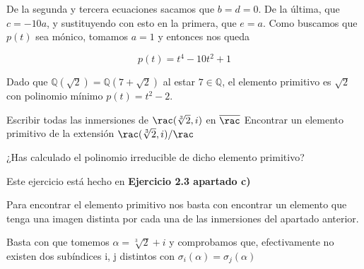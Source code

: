 \begin{problem}[1]
De la segunda y tercera ecuaciones sacamos que $b = d = 0$. De la última, que $c = -10a$, y sustituyendo con esto en la primera, que $e = a$. Como buscamos que $p(t)$ sea mónico, tomamos $a = 1$ y entonces nos queda

\[ p(t) = t^4 - 10t^2 + 1 \]

\spart

Dado que $ℚ(\sqrt{2}) = ℚ(7 + \sqrt{2})$ al estar $7 ∈ ℚ$, el elemento primitivo es $\sqrt{2}$ con polinomio mínimo $p(t) = t^2 - 2$.
\end{problem}

\begin{problem}[2]
\ppart Escribir todas las inmersiones de $\rac(\sqrt[3]{2}, i)$ en $\overline{\rac}$
\ppart Encontrar un elemento primitivo de la extensión $\rac(\sqrt[3]{2}, i)/\rac$

¿Has calculado el polinomio irreducible de dicho elemento primitivo?
\solution

\spart
Este ejercicio está hecho en \textbf{Ejercicio 2.3 apartado c)}

\spart
Para encontrar el elemento primitivo nos basta con encontrar un elemento que tenga una imagen distinta por cada una de las inmersiones del apartado anterior.

Basta con que tomemos $\alpha = \sqrt[3]{2} + i$ y comprobamos que, efectivamente no existen dos subíndices i, j distintos con $\sigma_i(\alpha)=\sigma_j(\alpha)$
\end{problem}

